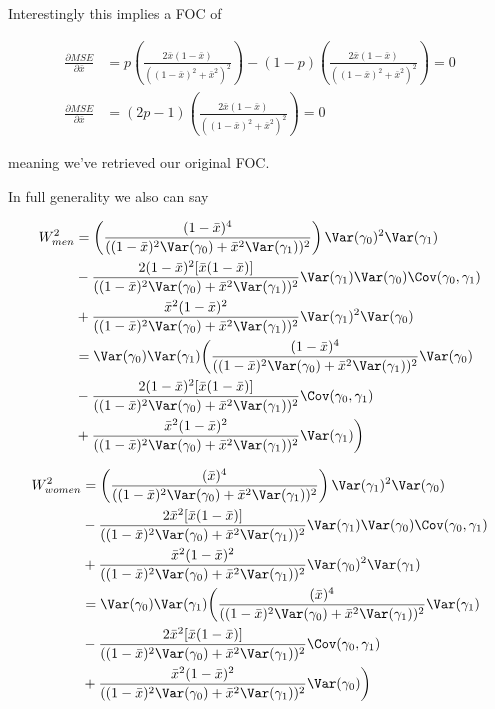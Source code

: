 Interestingly this implies a FOC of

\begin{align*}
	\frac{\partial MSE }{\partial \bar{x}} &= p \left(\frac{2 \bar{x} (1 - \bar{x})}{((1-\bar{x})^2 + \bar{x}^2)^2}\right) - (1-p) \left(\frac{2 \bar{x} (1 - \bar{x})}{((1-\bar{x})^2 + \bar{x}^2)^2} \right) = 0 \\
	\frac{\partial MSE}{\partial \bar{x}} &= (2p -1) \left(\frac{2 \bar{x} (1 - \bar{x})}{((1-\bar{x})^2 + \bar{x}^2)^2}\right) = 0
\end{align*} 

meaning we've retrieved our original FOC.

In full generality we also can say

\begin{align*}
	W_{men}^2 &= \left(\frac{(1 - \bar{x})^4}{((1-\bar{x})^2 \Var(\gamma_0) + \bar{x}^2 \Var(\gamma_1))^2}\right)\Var(\gamma_0)^2 \Var(\gamma_1)  \\
			  & -  \frac{2 (1 - \bar{x})^2[\bar{x} (1-\bar{x})]}{((1-\bar{x})^2 \Var(\gamma_0) + \bar{x}^2 \Var(\gamma_1))^2} \Var(\gamma_1) \Var(\gamma_0) \Cov(\gamma_0, \gamma_1)  \\
			  & + \frac{\bar{x}^2 (1-\bar{x})^2}{((1-\bar{x})^2 \Var(\gamma_0) + \bar{x}^2 \Var(\gamma_1))^2} \Var(\gamma_1)^2 \Var(\gamma_0) \\
			  &= \Var(\gamma_0) \Var(\gamma_1) \bigg(\frac{(1 - \bar{x})^4}{((1-\bar{x})^2 \Var(\gamma_0) + \bar{x}^2 \Var(\gamma_1))^2}\Var(\gamma_0)  \\
			  & -  \frac{2 (1 - \bar{x})^2[\bar{x} (1-\bar{x})]}{((1-\bar{x})^2 \Var(\gamma_0) + \bar{x}^2 \Var(\gamma_1))^2} \Cov(\gamma_0, \gamma_1)  \\
			  & + \frac{\bar{x}^2 (1-\bar{x})^2}{((1-\bar{x})^2 \Var(\gamma_0) + \bar{x}^2 \Var(\gamma_1))^2} \Var(\gamma_1) \bigg) \\
\end{align*} 


\begin{align*}
	W_{women}^2 &= \left(\frac{(\bar{x})^4}{((1-\bar{x})^2 \Var(\gamma_0) + \bar{x}^2 \Var(\gamma_1))^2}\right)\Var(\gamma_1)^2 \Var(\gamma_0)  \\
				& -  \frac{2 \bar{x}^2[\bar{x} (1-\bar{x})]}{((1-\bar{x})^2 \Var(\gamma_0) + \bar{x}^2 \Var(\gamma_1))^2} \Var(\gamma_1) \Var(\gamma_0) \Cov(\gamma_0, \gamma_1)  \\
				& + \frac{\bar{x}^2 (1-\bar{x})^2}{((1-\bar{x})^2 \Var(\gamma_0) + \bar{x}^2 \Var(\gamma_1))^2} \Var(\gamma_0)^2 \Var(\gamma_1) \\
				&= \Var(\gamma_0) \Var(\gamma_1) \bigg(\frac{(\bar{x})^4}{((1-\bar{x})^2 \Var(\gamma_0) + \bar{x}^2 \Var(\gamma_1))^2}\Var(\gamma_1) \\
				& -  \frac{2 \bar{x}^2[\bar{x} (1-\bar{x})]}{((1-\bar{x})^2 \Var(\gamma_0) + \bar{x}^2 \Var(\gamma_1))^2} \Cov(\gamma_0, \gamma_1)  \\
				& + \frac{\bar{x}^2 (1-\bar{x})^2}{((1-\bar{x})^2 \Var(\gamma_0) + \bar{x}^2 \Var(\gamma_1))^2} \Var(\gamma_0) \bigg) \\
\end{align*} 


